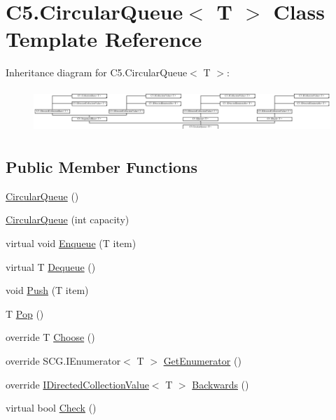 \hypertarget{class_c5_1_1_circular_queue}{}\section{C5.\+Circular\+Queue$<$ T $>$ Class Template Reference}
\label{class_c5_1_1_circular_queue}


 


Inheritance diagram for C5.\+Circular\+Queue$<$ T $>$\+:\begin{figure}[H]
\begin{center}
\leavevmode
\includegraphics[height=1.643193cm]{class_c5_1_1_circular_queue}
\end{center}
\end{figure}
\subsection*{Public Member Functions}
\begin{DoxyCompactItemize}
\item 
\hyperlink{class_c5_1_1_circular_queue_a8b23dc95a35d343c2d6a745ebb812090}{Circular\+Queue} ()
\item 
\hyperlink{class_c5_1_1_circular_queue_a7b0161842b7ffcd9309257cf6e11a205}{Circular\+Queue} (int capacity)
\item 
virtual void \hyperlink{class_c5_1_1_circular_queue_a38228eb467c6366bbdfe930af2a6a3f7}{Enqueue} (T item)
\item 
virtual T \hyperlink{class_c5_1_1_circular_queue_ad52b370d4ab23656feeeeddf840da857}{Dequeue} ()
\item 
void \hyperlink{class_c5_1_1_circular_queue_a03b6cfbe23af1164ef4b68db24698ce7}{Push} (T item)
\item 
T \hyperlink{class_c5_1_1_circular_queue_a0a8d62216e8a17d072829f1c6214a262}{Pop} ()
\item 
override T \hyperlink{class_c5_1_1_circular_queue_aeabd2341783df834015d58b04c0c0a11}{Choose} ()
\item 
override S\+C\+G.\+I\+Enumerator$<$ T $>$ \hyperlink{class_c5_1_1_circular_queue_ae1ab5e745ced280db9b9a175a66dc5b4}{Get\+Enumerator} ()
\item 
override \hyperlink{interface_c5_1_1_i_directed_collection_value}{I\+Directed\+Collection\+Value}$<$ T $>$ \hyperlink{class_c5_1_1_circular_queue_a9df19a0a07cd854a59df4d3f976cf169}{Backwards} ()
\item 
virtual bool \hyperlink{class_c5_1_1_circular_queue_a57f406e63f6a7f41e9617933220e42a3}{Check} ()
\end{DoxyCompactItemize}
